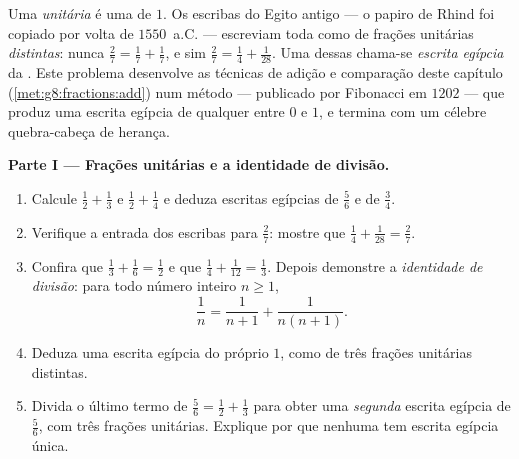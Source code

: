 \begin{problem}
\label{pb:g8:fractions:1}
Uma \emph{ unitária} é uma  de  $1$. Os escribas
do Egito antigo --- o papiro de Rhind foi copiado por volta de
$1550$~a.C. --- escreviam toda  como  de frações unitárias
\emph{distintas}: nunca $\frac27 = \frac17 + \frac17$, e sim
$\frac27 = \frac14 + \frac{1}{28}$. Uma  dessas chama-se
\emph{escrita egípcia} da . Este problema desenvolve as técnicas
de adição e comparação deste capítulo (\cref{met:g8:fractions:add}) num
método --- publicado por Fibonacci em $1202$ --- que produz uma escrita
egípcia de qualquer  entre $0$ e $1$, e termina com um célebre
quebra-cabeça de herança.

\medskip
\noindent\textbf{Parte I --- Frações unitárias e a identidade de
divisão.}
\begin{enumerate}
  \item Calcule $\frac12 + \frac13$ e $\frac12 + \frac14$ e deduza
        escritas egípcias de $\frac56$ e de $\frac34$.
  \item Verifique a entrada dos escribas para $\frac27$: mostre que
        $\frac14 + \frac{1}{28} = \frac27$.
  \item Confira que $\frac13 + \frac16 = \frac12$ e que
        $\frac14 + \frac{1}{12} = \frac13$. Depois demonstre a
        \emph{identidade de divisão}: para todo número inteiro
        $n \geq 1$,
        \[
        \frac{1}{n} = \frac{1}{n+1} + \frac{1}{n(n+1)} .
        \]
  \item Deduza uma escrita egípcia do próprio $1$, como  de três
        frações unitárias distintas.
  \item Divida o último termo de $\frac56 = \frac12 + \frac13$ para
        obter uma \emph{segunda} escrita egípcia de $\frac56$, com três
        frações unitárias. Explique por que nenhuma  tem escrita
        egípcia única.
\end{enumerate}


\end{problem}
